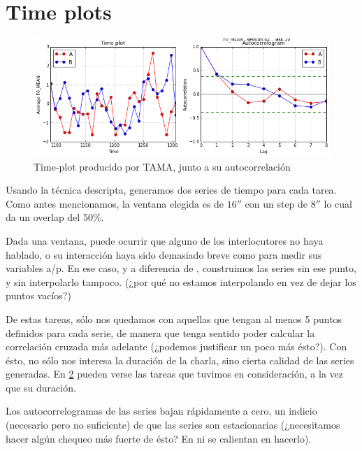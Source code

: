 \section{Time plots}

\begin{figure}
\centering
\includegraphics[width=15cm]{images/time_plot_with_autocorrelation.png}
\caption{Time-plot producido por TAMA, junto a su autocorrelación \label{time_plot}}

\end{figure}

Usando la técnica descripta, generamos dos series de tiempo para cada tarea. Como antes mencionamos, la ventana elegida es de $16''$ con un step de $8''$ lo cual da un overlap del 50\%.

Dada una ventana, puede ocurrir que alguno de los interlocutores no haya hablado, o su interacción haya sido demasiado breve como para medir sus variables a/p. En ese caso, y a diferencia de \cite{KOU2008}, construimos las series sin ese punto, y sin interpolarlo tampoco. (¿por qué no estamos interpolando en vez de dejar los puntos vacíos?)

De estas tareas, sólo nos quedamos con aquellas que tengan al menos 5 puntos definidos para cada serie, de manera que tenga sentido poder calcular la correlación cruzada más adelante (¿podemos justificar un poco más ésto?). Con ésto, no sólo nos interesa la duración de la charla, sino cierta calidad de las series generadas. En \ref{time_series_table} pueden verse las tareas que tuvimos en consideración, a la vez que su duración.

\begin{figure}
\centering


\label{time_series_table}
\end{figure}

Los autocorrelogramas de las series bajan rápidamente a cero, un indicio (necesario pero no suficiente) de que las series son estacionarias (¿necesitamos hacer algún chequeo más fuerte de ésto? En \cite{KOU2009} ni se calientan en hacerlo).

